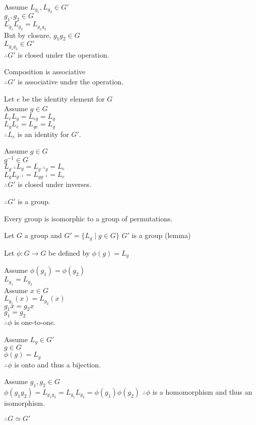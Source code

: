 \documentclass[letterpaper,12pt,fleqn]{article}
\newcommand{\p}{\phi}
\begin{document}
\begin{theproof}
  Assume $L_{g_1},L_{g_2}\in G'$ \\
  $g_1,g_2\in G$ \\
  $L_{g_1}L_{g_2}=L_{g_1g_2}$ \\
  But by closure, $g_1g_2\in G$ \\
  $L_{g_1g_2}\in G'$ \\
  $\therefore G'$ is closed under the operation.

  Composition is associative \\
  $\therefore G'$ is associative under the operation.

  Let $e$ be the identity element for $G$ \\
  Assume $g\in G$ \\
  $L_eL_g=L_{eg}=L_g$ \\
  $L_gL_e=L_{ge}=L_g$ \\
  $\therefore L_e$ is an identity for $G'$.

  Assume $g\in G$ \\
  $g^{-1}\in G$ \\
  $L_{g^{-1}}L_g=L_{g^{-1}g}=L_e$ \\
  $L_gL_{g^{-1}}=L_{gg^{-1}}=L_e$ \\
  $\therefore G'$ is closed under inverses.

  $\therefore G'$ is a group.
\end{theproof}

\begin{theorem}[Cayley]
  Every group is isomorphic to a group of permutations.
\end{theorem}

\begin{theproof}
  Let $G$ a group and $G'=\{L_g\mid g\in G\}$
  $G'$ is a group (lemma)

  Let $\p:G\to G$ be defined by $\p(g)=L_g$

  Assume $\p(g_1)=\p(g_2)$ \\
  $L_{g_1}=L_{g_2}$ \\
  Assume $x\in G$ \\
  $L_{g_1}(x)=L_{g_2}(x)$ \\
  $g_1x=g_2x$ \\
  $g_1=g_2$ \\
  $\therefore \p$ is one-to-one.

  Assume $L_g\in G'$ \\
  $g\in G$ \\
  $\p(g)=L_g$ \\
  $\therefore \p$ is onto and thus a bijection.

  Assume $g_1,g_2\in G$ \\
  $\p(g_1g_2)=L_{g_1g_2}=L_{g_1}L_{g_2}=\p(g_1)\p(g_2)$
  $\therefore \p$ is a homomorphism and thus an isomorphism.

  $\therefore G\simeq G'$
\end{theproof}
\end{document}
